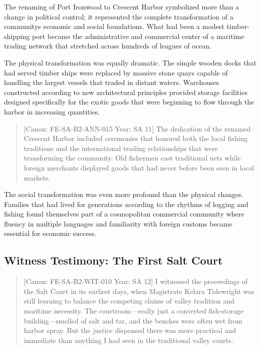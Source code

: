 The renaming of Port Ironwood to Crescent Harbor symbolized more than a
change in political control; it represented the complete transformation
of a community\textquotesingle s economic and social foundations. What
had been a modest timber-shipping port became the administrative and
commercial center of a maritime trading network that stretched across
hundreds of leagues of ocean.

The physical transformation was equally dramatic. The simple wooden
docks that had served timber ships were replaced by massive stone quays
capable of handling the largest vessels that traded in distant waters.
Warehouses constructed according to new architectural principles
provided storage facilities designed specifically for the exotic goods
that were beginning to flow through the harbor in increasing quantities.

\begin{quote}
{[}Canon: FE-SA-B2-ANN-015 \textbar{} Year: SA 11{]} The dedication of
the renamed Crescent Harbor included ceremonies that honored both the
local fishing traditions and the international trading relationships
that were transforming the community. Old fishermen cast traditional
nets while foreign merchants displayed goods that had never before been
seen in local markets.
\end{quote}

The social transformation was even more profound than the physical
changes. Families that had lived for generations according to the
rhythms of logging and fishing found themselves part of a cosmopolitan
commercial community where fluency in multiple languages and familiarity
with foreign customs became essential for economic success.

\subsection{Witness Testimony: The First Salt
Court}\label{witness-testimony-the-first-salt-court}

\begin{quote}
{[}Canon: FE-SA-B2-WIT-010 \textbar{} Year: SA 12{]} I witnessed the
proceedings of the Salt Court in its earliest days, when Magistrate
Kelara Tidewright was still learning to balance the competing claims of
valley tradition and maritime necessity. The courtroom---really just a
converted fish-storage building---smelled of salt and tar, and the
benches were often wet from harbor spray. But the justice dispensed
there was more practical and immediate than anything I had seen in the
traditional valley courts.
\end{quote}

